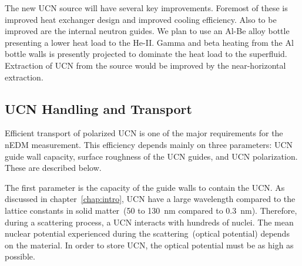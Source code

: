 The new UCN source will have several key improvements. Foremost of these
is improved heat exchanger design and improved cooling
efficiency. Also to be improved are the internal neutron guides. We
plan to use an Al-Be alloy bottle presenting a lower heat load to the
He-II. Gamma and beta heating from the Al bottle walls is presently
projected to dominate the heat load to the superfluid. Extraction of
UCN from the source would be improved by the near-horizontal
extraction.





\subsection{UCN Handling and Transport}

Efficient transport of polarized UCN is one of the major requirements
for the nEDM measurement. This efficiency depends mainly on three
parameters: UCN guide wall capacity, surface roughness of the UCN
guides, and UCN polarization. These are described below.

The first parameter is the capacity of the guide walls to contain the
UCN. As discussed in chapter~\ref{chap:intro}, UCN have a large
wavelength compared to the lattice constants in solid matter~(50 to
130~nm compared to 0.3~nm). Therefore, during a scattering process, a
UCN interacts with hundreds of nuclei. The mean nuclear potential
experienced during the scattering~(optical potential) depends on the
material. In order to store UCN, the optical potential must be as high
as possible.

